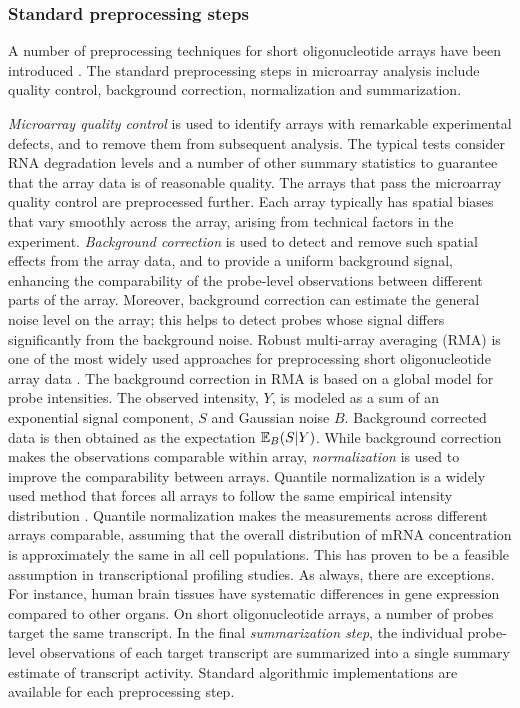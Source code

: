 \subsubsection{Standard preprocessing steps}

A number of preprocessing techniques for short oligonucleotide arrays
have been introduced \citep{Irizarry06, Reimers2010}. The standard
preprocessing steps in microarray analysis include quality control,
background correction, normalization and summarization.

{\it Microarray quality control} is used to identify arrays with
remarkable experimental defects, and to remove them from subsequent
analysis. The typical tests consider RNA degradation levels and a
number of other summary statistics to guarantee that the array data is
of reasonable quality. The arrays that pass the microarray quality
control are preprocessed further. Each array typically has spatial
biases that vary smoothly across the array, arising from technical
factors in the experiment. {\it Background correction} is used to
detect and remove such spatial effects from the array data, and to
provide a uniform background signal, enhancing the comparability of
the probe-level observations between different parts of the
array. Moreover, background correction can estimate the general noise
level on the array; this helps to detect probes whose signal differs
significantly from the background noise. Robust multi-array averaging
(RMA) is one of the most widely used approaches for preprocessing
short oligonucleotide array data \citep{Irizarry03rma}.  The
background correction in RMA is based on a global model for probe
intensities. The observed intensity, \(Y\), is modeled as a sum of an
exponential signal component, \(S\) and Gaussian noise
\(B\). Background corrected data is then obtained as the expectation
\(\mathbb{E}_B(S|Y)\). While background correction makes the observations
comparable within array, {\it normalization} is used to improve the
comparability between arrays. Quantile normalization is a widely used
method that forces all arrays to follow the same empirical intensity
distribution \citep[see e.g.][]{Bolstad03}.  Quantile normalization
makes the measurements across different arrays comparable, assuming
that the overall distribution of mRNA concentration is approximately
the same in all cell populations. This has proven to be a feasible
assumption in transcriptional profiling studies. As always, there are
exceptions. For instance, human brain tissues have systematic
differences in gene expression compared to other organs. On short
oligonucleotide arrays, a number of probes target the same
transcript. In the final {\it summarization step}, the individual
probe-level observations of each target transcript are summarized into
a single summary estimate of transcript activity. Standard algorithmic
implementations are available for each preprocessing step.


